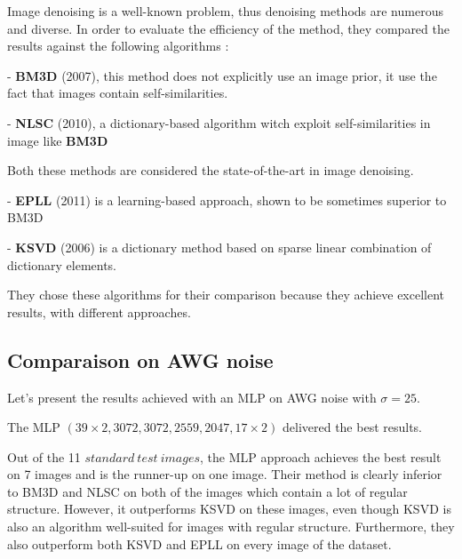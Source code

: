 \documentclass[10pt,a4paper]{article}
\newcommand{\svs}{\vspace{9pt}}
\begin{document}
Image denoising is a well-known problem, thus denoising methods are numerous and diverse. In order to evaluate the efficiency of the method, they compared the results against the following algorithms :

\svs
- \textbf{BM3D} (2007), this method does not explicitly use an image prior, it use the fact that images contain self-similarities.
\svs

- \textbf{NLSC} (2010), a dictionary-based algorithm witch exploit self-similarities in image like \textbf{BM3D}

\svs

Both these methods are considered the state-of-the-art in image denoising.

\svs

- \textbf{EPLL} (2011) is a learning-based approach, shown to be sometimes superior to BM3D

\svs

- \textbf{KSVD} (2006) is a dictionary method based on sparse linear combination of dictionary elements.

They chose these algorithms for their comparison because they achieve excellent results, with different approaches.

\subsection{Comparaison on AWG noise}

Let's present the results achieved with an MLP on AWG noise with $\sigma=25$.

\svs 

The MLP $(39 \times 2, 3072, 3072, 2559, 2047, 17 \times 2)$ delivered the best results.

\svs 

Out of the 11 $standard\ test\ images$, the MLP approach achieves the best result on 7 images and is the runner-up on one image.
Their method is clearly inferior to BM3D and NLSC on both of the images which contain a lot of regular structure. However, it outperforms KSVD on these images, even though KSVD is also an algorithm well-suited for images with regular structure. Furthermore, they also outperform both KSVD and EPLL on every image of the dataset.
\end{document}
